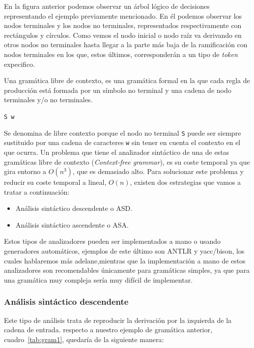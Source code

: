 \documentclass{article}
\begin{document}
    En la figura anterior podemos observar un árbol lógico de decisiones representando el ejemplo previamente mencionado.
    En él podemos observar los nodos terminales y los nodos no terminales, representados respectivamente con rectángulos
    y círculos. Como vemos el nodo inicial o nodo raíz va derivando en otros nodos no terminales hasta llegar a la parte
    más baja de la ramificación con nodos terminales en los que, estos últimos, corresponderán a un tipo de \textit{token} expecifico.

    Una gramática libre de contexto, es una gramática formal en la que cada regla de producción está formada por un símbolo
    no terminal y una cadena de nodo terminales y/o no terminales.
    \begin{table}
        \centering
        \texttt{S \rightarrow w }
    \end{table}
    Se denomina de libre contexto porque el nodo no terminal \texttt{S} puede ser siempre sustituido por una cadena de caracteres
    \texttt{w} sin tener en cuenta el contexto en el que ocurra.
    Un problema que tiene el analizador sintáctico de una de estas gramáticas libre de contexto (\textit{Context-free grammar}),
    es su coste temporal ya que gira entorno a $O(n^3)$, que es demasiado alto. Para solucionar este problema y
    reducir su coste temporal a lineal, $O(n)$, existen dos
    estrategias que vamos a tratar a continuación:

    \begin{itemize}
        \item Análisis sintáctico descendente o ASD.
        \item Análisis sintáctico ascendente o ASA.
    \end{itemize}

    Estos tipos de analizadores pueden ser implementados a mano o usando generadores automáticos, ejemplos de este último
    son ANTLR y yacc/bison, los cuales hablaremos más adelane,mientras que la implementación a mano de estos analizadores
    son recomendables únicamente para gramáticas simples, ya que para una gramática muy compleja sería muy difícil de implementar.

    \subsubsection*{Análisis sintáctico descendente}

    Este tipo de análisis trata de reproducir la derivación por la izquierda de la cadena de entrada.
    respecto a nuestro ejemplo de gramática anterior, cuadro~\ref{tab:gram1}, quedaría de la siguiente manera:
\end{document}
